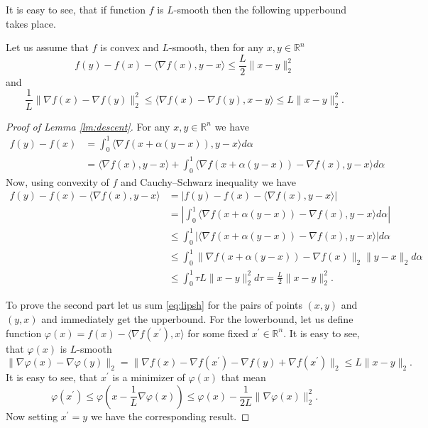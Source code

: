 It is easy to see, that if function $f$ is $L$-smooth then the following upperbound takes place.
\begin{lemma}\label{lm:descent}
    Let us assume that $f$ is convex and $L$-smooth, then for any $x,y\in\mathbb{R}^n$
    \begin{equation}\label{eq:descent_lemma_1}
        f(y) - f(x) - \langle \nabla f(x), y-x\rangle\leq \frac{L}{2}\|x-y\|_2^2
    \end{equation}
    and
    \begin{equation}\label{eq:descent_lemma_2}
        \frac{1}{L}\|\nabla f(x) - \nabla f(y)\|_2^2 \leq\langle \nabla f(x) - \nabla f (y), x - y\rangle \leq L\|x-y\|_2^2.
    \end{equation}
\end{lemma}
\begin{proof}[Proof of Lemma \ref{lm:descent}]
   For any $x,y\in\mathbb{R}^n$ we have
   \begin{align}
        f(y) - f(x)  &= \int_0^1\langle\nabla f(x + \alpha(y-x)), y-x\rangle d\alpha\nonumber\\
         &= \langle \nabla f(x), y-x\rangle + \int_0^1\langle\nabla f(x + \alpha(y-x)) - \nabla f(x), y-x\rangle d\alpha
   \end{align}
Now, using  convexity of $f$ and Cauchy–Schwarz inequality we have
\begin{align}\label{eq:lipsh}
    f(y)-f(x) - \langle \nabla f(x), y-x\rangle &= |f(y)-f(x) - \langle \nabla f(x), y-x\rangle|\nonumber\\ &= \left|\int_0^1\langle\nabla f(x + \alpha(y-x)) - \nabla f(x), y-x\rangle d\alpha\right|\nonumber\\
 &\leq \int_0^1|\langle\nabla f(x + \alpha(y-x)) - \nabla f(x), y-x\rangle| d\alpha\nonumber\\
&\leq\int_0^1\|\nabla f(x + \alpha(y-x)) - \nabla f(x)\|_2\|y-x\|_2 d\alpha\nonumber\\
&\leq \int_0^1\tau L\|x-y\|_2^2 d\tau = \frac{L}{2}\|x-y\|_2^2.
\end{align}

To prove the second part let us sum \eqref{eq:lipsh} for the pairs of points $(x,y)$ and $(y,x)$ and immediately get the upperbound.
For the lowerbound, let us define function $\varphi(x)  = f(x) - \langle \nabla f(x^\prime), x\rangle$ for some fixed $x^\prime\in\mathbb{R}^n$.
It is easy to see, that $\varphi(x)$ is $L$-smooth
$$
\|\nabla\varphi(x) - \nabla\varphi(y)\|_2 = \|\nabla f(x) - \nabla f(x^\prime) - \nabla f(y) + \nabla f(x^\prime)\|_2\leq L\|x-y\|_2.
$$
It is easy to see, that $x^\prime$ is a minimizer of $\varphi(x)$ that mean
\begin{equation}
\varphi(x^\prime) \leq \varphi(x - \frac{1}{L}\nabla \varphi(x))\leq \varphi(x) - \frac{1}{2L}\|\nabla \varphi(x)\|_2^2. 
\end{equation}
Now setting $x^\prime = y$ we have the corresponding result.
\end{proof}




